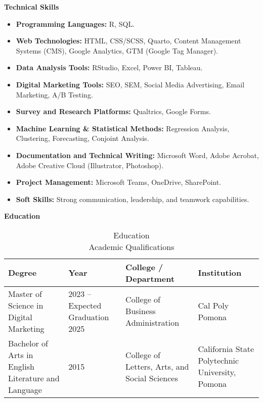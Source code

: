 \documentclass[10pt,a4paper,]{article}
\renewcommand{\section}[1]
{
	\begin{center}
		\large\textcolor{sectcol}{\textbf{#1}}
	\end{center}
}
\providecommand{\tightlist}{%
  \setlength{\itemsep}{0pt}\setlength{\parskip}{0pt}}
\begin{document}
\section{Technical Skills}\label{technical-skills}

\begin{itemize}
\tightlist
\item
  \textbf{Programming Languages:} R, SQL.
\item
  \textbf{Web Technologies:} HTML, CSS/SCSS, Quarto, Content Management
  Systems (CMS), Google Analytics, GTM (Google Tag Manager).
\item
  \textbf{Data Analysis Tools:} RStudio, Excel, Power BI, Tableau.
\item
  \textbf{Digital Marketing Tools:} SEO, SEM, Social Media Advertising,
  Email Marketing, A/B Testing.
\item
  \textbf{Survey and Research Platforms:} Qualtrics, Google Forms.
\item
  \textbf{Machine Learning \& Statistical Methods:} Regression Analysis,
  Clustering, Forecasting, Conjoint Analysis.
\item
  \textbf{Documentation and Technical Writing:} Microsoft Word, Adobe
  Acrobat, Adobe Creative Cloud (Illustrator, Photoshop).
\item
  \textbf{Project Management:} Microsoft Teams, OneDrive, SharePoint.
\item
  \textbf{Soft Skills:} Strong communication, leadership, and teamwork
  capabilities.
\end{itemize}

\section{Education}\label{education}

\begin{table}[t]
\caption*{
{\large Education} \\ 
{\small Academic Qualifications}
} 
\fontsize{12.0pt}{14.4pt}\selectfont
\begin{tabular*}{\linewidth}{@{\extracolsep{\fill}}llll}
\toprule
Degree & Year & College / Department & Institution \\ 
\midrule\addlinespace[2.5pt]
Master of Science in Digital Marketing & 2023 – Expected Graduation 2025 & College of Business Administration & Cal Poly Pomona \\ 
Bachelor of Arts in English Literature and Language & 2015 & College of Letters, Arts, and Social Sciences & California State Polytechnic University, Pomona \\ 
\bottomrule
\end{tabular*}
\end{table}
\end{document}
